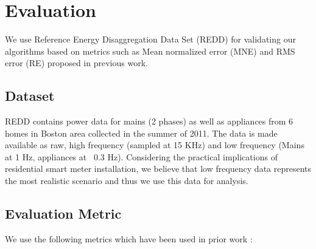 \documentclass[conference]{IEEEtran}
\newcommand{\figref}[1]{Figure~\ref{#1}}
\begin{document}
\section{Evaluation}

\noindent We use Reference Energy Disaggregation Data Set (REDD) \cite{redd} for validating our algorithms based on metrics such as Mean normalized error (MNE) and RMS error (RE) proposed in previous work.
\subsection{Dataset}
\noindent REDD contains power data for mains (2 phases) as well as appliances from 6 homes in Boston area collected in the summer of 2011. The data is made available as raw, high frequency (sampled at 15 KHz) and low frequency (Mains at 1 Hz, appliances at ~0.3 Hz). Considering the practical implications of residential smart meter installation, we believe that low frequency data represents the most realistic scenario and thus we use this data for analysis. 



%	
%
\subsection{Evaluation Metric}

\noindent We use the following metrics which have been used in prior work \cite{parson2012_aaai,redd}:
\end{document}
